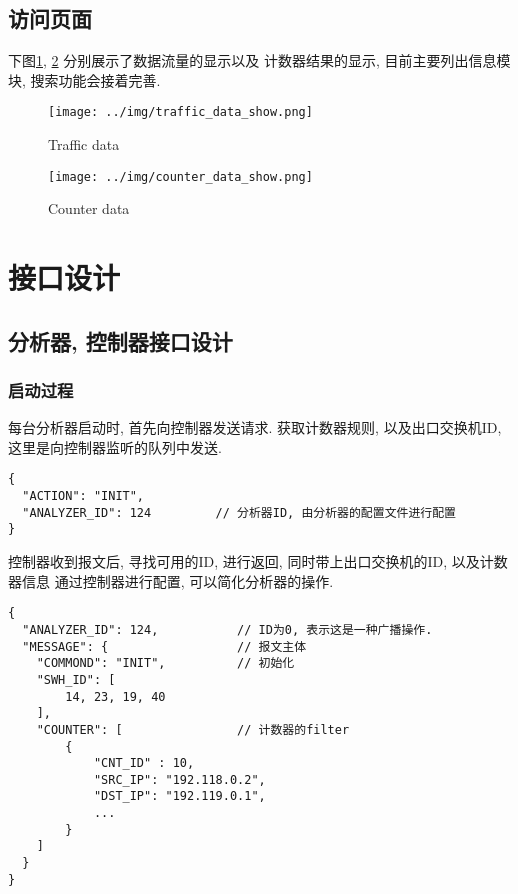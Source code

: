 \section{访问页面}

下图\ref{fig:traffic_data_show}, \ref{fig:counter_data_show}
分别展示了数据流量的显示以及 计数器结果的显示, 目前主要列出信息模块,
搜索功能会接着完善.

\begin{figure}[htbp!]
  \centering 
  \texttt{[image: ../img/traffic\_data\_show.png]}
  \caption{Traffic data}
  \label{fig:traffic_data_show}
\end{figure}

\begin{figure}[htbp!]
  \centering
  \texttt{[image: ../img/counter\_data\_show.png]}
  \caption{Counter data}
  \label{fig:counter_data_show}
\end{figure}


\chapter{接口设计}\label{chap:接口设计}

\section{分析器, 控制器接口设计}

\subsection{启动过程}

每台分析器启动时, 首先向控制器发送请求. 获取计数器规则, 以及出口交换机ID,
这里是向控制器监听的队列中发送.

\begin{lstlisting}
{
  "ACTION": "INIT",
  "ANALYZER_ID": 124         // 分析器ID, 由分析器的配置文件进行配置
}
\end{lstlisting}

控制器收到报文后, 寻找可用的ID, 进行返回, 同时带上出口交换机的ID, 以及计数器信息
通过控制器进行配置, 可以简化分析器的操作.

\begin{lstlisting}
{
  "ANALYZER_ID": 124,           // ID为0, 表示这是一种广播操作.
  "MESSAGE": {                  // 报文主体
    "COMMOND": "INIT",          // 初始化
    "SWH_ID": [
        14, 23, 19, 40
    ],
    "COUNTER": [                // 计数器的filter
        {
            "CNT_ID" : 10,
            "SRC_IP": "192.118.0.2",
            "DST_IP": "192.119.0.1",
            ...
        }
    ]
  }
}
\end{lstlisting}

